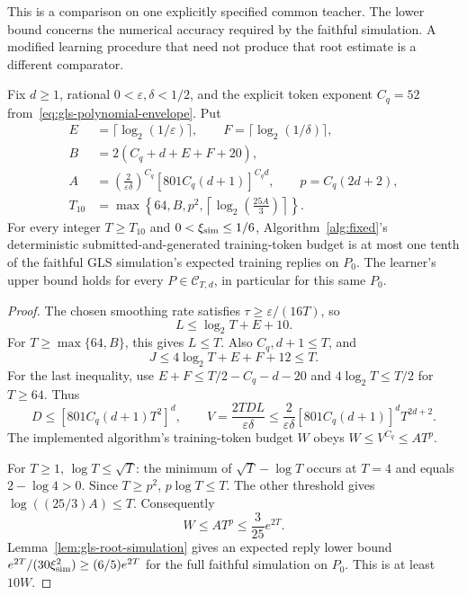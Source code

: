 \documentclass[11pt]{article}
\theoremstyle{definition}
\theoremstyle{remark}
\begin{document}
This is a comparison on one explicitly specified common teacher. The lower bound concerns the numerical accuracy required by the faithful simulation. A modified learning procedure that need not produce that root estimate is a different comparator.

Fix $d\ge1$, rational $0<\varepsilon,\delta<1/2$, and the explicit token exponent $C_q=52$ from~\eqref{eq:gls-polynomial-envelope}. Put
\[
\begin{split}
E&=\lceil\log_2(1/\varepsilon)\rceil,\qquad
F=\lceil\log_2(1/\delta)\rceil,\\
B&=2(C_q+d+E+F+20),\\
A&=\left(\frac2{\varepsilon\delta}\right)^{C_q}
       [801C_q(d+1)]^{C_qd},\qquad p=C_q(2d+2),\\
T_{10}&=\max\left\{64,B,p^2,
       \left\lceil\log_2\left(\frac{25A}{3}\right)\right\rceil\right\}.
\end{split}
\]
For every integer $T\ge T_{10}$ and $0<\xi_{\rm sim}\le1/6$, Algorithm~\ref{alg:fixed}'s deterministic submitted-and-generated training-token budget is at most one tenth of the faithful GLS simulation's expected training replies on $P_0$. The learner's upper bound holds for every $P\in\mathcal C_{T,d}$, in particular for this same $P_0$.

\begin{proof}
The chosen smoothing rate satisfies $\tau\ge\varepsilon/(16T)$, so
\[
L\le\log_2T+E+10.
\]
For $T\ge\max\{64,B\}$, this gives $L\le T$. Also $C_q,d+1\le T$, and
\[
J\le4\log_2T+E+F+12\le T.
\]
For the last inequality, use $E+F\le T/2-C_q-d-20$ and $4\log_2T\le T/2$ for $T\ge64$. Thus
\[
D\le[801C_q(d+1)T^2]^d,\qquad
V=\frac{2TDL}{\varepsilon\delta}
\le\frac2{\varepsilon\delta}[801C_q(d+1)]^dT^{2d+2}.
\]
The implemented algorithm's training-token budget $W$ obeys $W\le V^{C_q}\le AT^p$.

For $T\ge1$, $\log T\le\sqrt T$: the minimum of $\sqrt T-\log T$ occurs at $T=4$ and equals $2-\log4>0$. Since $T\ge p^2$, $p\log T\le T$. The other threshold gives $\log((25/3)A)\le T$. Consequently
\[
W\le AT^p\le\frac3{25}e^{2T}.
\]
Lemma~\ref{lem:gls-root-simulation} gives an expected reply lower bound
$e^{2T}/(30\xi_{\rm sim}^2)\ge(6/5)e^{2T}$ for the full faithful simulation on $P_0$. This is at least $10W$.
\end{proof}
\end{document}
